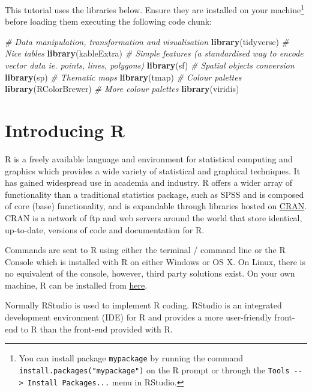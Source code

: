 \documentclass[
]{book}
\newenvironment{Shaded}{\begin{snugshade}}{\end{snugshade}}
\newcommand{\CommentTok}[1]{\textcolor[rgb]{0.56,0.35,0.01}{\textit{#1}}}
\newcommand{\KeywordTok}[1]{\textcolor[rgb]{0.13,0.29,0.53}{\textbf{#1}}}
\newcommand{\NormalTok}[1]{#1}
\begin{document}
This tutorial uses the libraries below. Ensure they are installed on your machine\footnote{You can install package \texttt{mypackage} by running the command \texttt{install.packages("mypackage")} on the R prompt or through the \texttt{Tools\ -\/-\textgreater{}\ Install\ Packages...} menu in RStudio.} before loading them executing the following code chunk:

\begin{Shaded}
\begin{Highlighting}[]
\CommentTok{# Data manipulation, transformation and visualisation}
\KeywordTok{library}\NormalTok{(tidyverse)}
\CommentTok{# Nice tables}
\KeywordTok{library}\NormalTok{(kableExtra)}
\CommentTok{# Simple features (a standardised way to encode vector data ie. points, lines, polygons)}
\KeywordTok{library}\NormalTok{(sf) }
\CommentTok{# Spatial objects conversion}
\KeywordTok{library}\NormalTok{(sp) }
\CommentTok{# Thematic maps}
\KeywordTok{library}\NormalTok{(tmap) }
\CommentTok{# Colour palettes}
\KeywordTok{library}\NormalTok{(RColorBrewer) }
\CommentTok{# More colour palettes}
\KeywordTok{library}\NormalTok{(viridis)}
\end{Highlighting}
\end{Shaded}

\hypertarget{introducing-r}{%
\section{Introducing R}\label{introducing-r}}

R is a freely available language and environment for statistical computing and graphics which provides a wide variety of statistical and graphical techniques. It has gained widespread use in academia and industry. R offers a wider array of functionality than a traditional statistics package, such as SPSS and is composed of core (base) functionality, and is expandable through libraries hosted on \href{https://cran.r-project.org}{CRAN}. CRAN is a network of ftp and web servers around the world that store identical, up-to-date, versions of code and documentation for R.

Commands are sent to R using either the terminal / command line or the R Console which is installed with R on either Windows or OS X. On Linux, there is no equivalent of the console, however, third party solutions exist. On your own machine, R can be installed from \href{https://www.r-project.org/}{here}.

Normally RStudio is used to implement R coding. RStudio is an integrated development environment (IDE) for R and provides a more user-friendly front-end to R than the front-end provided with R.
\end{document}
